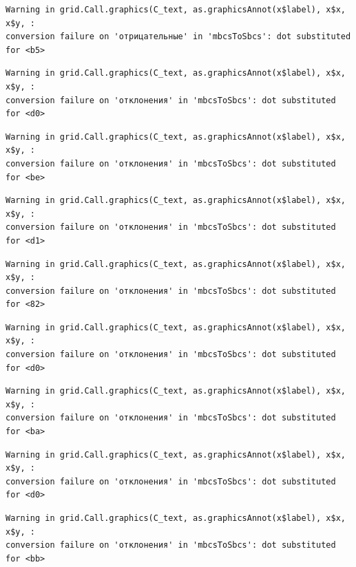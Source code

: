 \documentclass[
  letterpaper,
  DIV=11,
  numbers=noendperiod]{scrreprt}
\theoremstyle{definition}
\theoremstyle{remark}
\begin{document}
\begin{verbatim}
Warning in grid.Call.graphics(C_text, as.graphicsAnnot(x$label), x$x, x$y, :
conversion failure on 'отрицательные' in 'mbcsToSbcs': dot substituted for <b5>
\end{verbatim}

\begin{verbatim}
Warning in grid.Call.graphics(C_text, as.graphicsAnnot(x$label), x$x, x$y, :
conversion failure on 'отклонения' in 'mbcsToSbcs': dot substituted for <d0>
\end{verbatim}

\begin{verbatim}
Warning in grid.Call.graphics(C_text, as.graphicsAnnot(x$label), x$x, x$y, :
conversion failure on 'отклонения' in 'mbcsToSbcs': dot substituted for <be>
\end{verbatim}

\begin{verbatim}
Warning in grid.Call.graphics(C_text, as.graphicsAnnot(x$label), x$x, x$y, :
conversion failure on 'отклонения' in 'mbcsToSbcs': dot substituted for <d1>
\end{verbatim}

\begin{verbatim}
Warning in grid.Call.graphics(C_text, as.graphicsAnnot(x$label), x$x, x$y, :
conversion failure on 'отклонения' in 'mbcsToSbcs': dot substituted for <82>
\end{verbatim}

\begin{verbatim}
Warning in grid.Call.graphics(C_text, as.graphicsAnnot(x$label), x$x, x$y, :
conversion failure on 'отклонения' in 'mbcsToSbcs': dot substituted for <d0>
\end{verbatim}

\begin{verbatim}
Warning in grid.Call.graphics(C_text, as.graphicsAnnot(x$label), x$x, x$y, :
conversion failure on 'отклонения' in 'mbcsToSbcs': dot substituted for <ba>
\end{verbatim}

\begin{verbatim}
Warning in grid.Call.graphics(C_text, as.graphicsAnnot(x$label), x$x, x$y, :
conversion failure on 'отклонения' in 'mbcsToSbcs': dot substituted for <d0>
\end{verbatim}

\begin{verbatim}
Warning in grid.Call.graphics(C_text, as.graphicsAnnot(x$label), x$x, x$y, :
conversion failure on 'отклонения' in 'mbcsToSbcs': dot substituted for <bb>
\end{verbatim}
\end{document}
